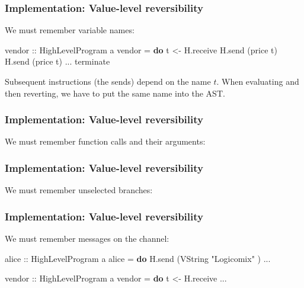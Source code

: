 \documentclass[12pt]{beamer}
\newenvironment{Shaded}{}{}
\newcommand{\KeywordTok}[1]{\textcolor[rgb]{0.00,0.44,0.13}{\textbf{#1}}}
\newcommand{\DataTypeTok}[1]{\textcolor[rgb]{0.56,0.13,0.00}{#1}}
\newcommand{\StringTok}[1]{\textcolor[rgb]{0.25,0.44,0.63}{#1}}
\newcommand{\OtherTok}[1]{\textcolor[rgb]{0.00,0.44,0.13}{#1}}
\newcommand{\FunctionTok}[1]{\textcolor[rgb]{0.02,0.16,0.49}{#1}}
\newcommand{\NormalTok}[1]{#1}
\begin{document}
\begin{frame}[fragile]
\frametitle{Implementation: Value-level reversibility}

We must remember variable names:

\begin{Shaded}
\begin{Highlighting}[]
\OtherTok{vendor ::} \DataTypeTok{HighLevelProgram}\NormalTok{ a}
\NormalTok{vendor }\FunctionTok{=} \KeywordTok{do}
\NormalTok{    t }\OtherTok{<-}\NormalTok{ H.receive}
\NormalTok{    H.send (price t) }
\NormalTok{    H.send (price t) }
    \FunctionTok{...}
\NormalTok{    terminate}
\end{Highlighting}
\end{Shaded}

Subsequent instructions (the sends) depend on the name $t$.
When evaluating and then reverting, we have to put the same name into the AST.

\end{frame}



\begin{frame}[fragile]
\frametitle{Implementation: Value-level reversibility}

We must remember function calls and their arguments:

\end{frame}

\begin{frame}[fragile]
\frametitle{Implementation: Value-level reversibility}

We must remember unselected branches:


\end{frame}


\begin{frame}[fragile]
\frametitle{Implementation: Value-level reversibility}

We must remember messages on the channel:

\begin{Shaded}
\begin{Highlighting}[]
\OtherTok{alice ::} \DataTypeTok{HighLevelProgram}\NormalTok{ a}
\NormalTok{alice }\FunctionTok{=} \KeywordTok{do}
\NormalTok{    H.send (}\DataTypeTok{VString} \StringTok{"Logicomix"}\NormalTok{ )}
    \FunctionTok{...}

\OtherTok{vendor ::} \DataTypeTok{HighLevelProgram}\NormalTok{ a}
\NormalTok{vendor }\FunctionTok{=} \KeywordTok{do}
\NormalTok{    t }\OtherTok{<-}\NormalTok{ H.receive}
    \FunctionTok{...}
\end{Highlighting}
\end{Shaded}

\end{frame}
\end{document}
